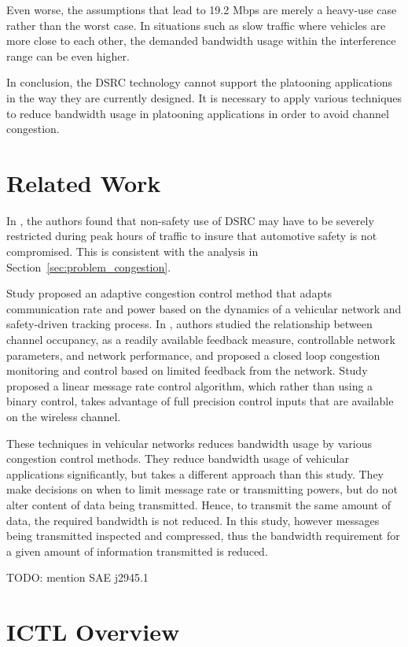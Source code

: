 \documentclass[12pt]{report}
\begin{document}
Even worse, the assumptions that lead to 19.2 Mbps are merely a heavy-use case rather than the worst case. In situations such as slow traffic where vehicles are more close to each other, the demanded bandwidth usage within the interference range can be even higher.

In conclusion, the DSRC technology cannot support the platooning applications in the way they are currently designed. It is necessary to apply various techniques to reduce bandwidth usage in platooning applications in order to avoid channel congestion.

\section{Related Work}

In \cite{Wang2008howmuch}, the authors found that non-safety use of DSRC may have to be severely restricted during peak hours of traffic to insure that automotive safety is not compromised. This is consistent with the analysis in Section~\ref{sec:problem_congestion}.

Study \cite{huang2010adaptive} proposed an adaptive congestion control method that adapts communication rate and power based on the dynamics of a vehicular network and safety-driven tracking process. In \cite{fallah2010occupancy}, authors studied the relationship between channel occupancy, as a readily available feedback measure, controllable network parameters, and network performance, and proposed a closed loop congestion monitoring and control based on limited feedback from the network. Study \cite{Kenney2011linear} proposed a linear message rate control algorithm, which rather than using a binary control, takes advantage of full precision control inputs that are available on the wireless channel.

These techniques in vehicular networks reduces bandwidth usage by various congestion control methods. They reduce bandwidth usage of vehicular applications significantly, but takes a different approach than this study. They make decisions on when to limit message rate or transmitting powers, but do not alter content of data being transmitted. Hence, to transmit the same amount of data, the required bandwidth is not reduced. In this study, however messages being transmitted inspected and compressed, thus the bandwidth requirement for a given amount of information transmitted is reduced.

TODO: mention SAE j2945.1

\section{ICTL Overview}
\end{document}
